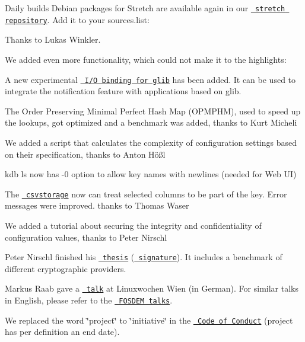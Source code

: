 Daily builds Debian packages for Stretch are available again in our \href{https://debian-stretch-repo.libelektra.org}{\texttt{ stretch repository}}. Add it to your {\ttfamily sources.\+list}\+:


\begin{DoxyCode}{0}
\end{DoxyCode}


Thanks to Lukas Winkler.

We added even more functionality, which could not make it to the highlights\+:


\begin{DoxyItemize}
\item A new experimental \href{https://www.libelektra.org/bindings/io_glib}{\texttt{ I/O binding for glib}} has been added. It can be used to integrate the notification feature with applications based on glib.
\item The Order Preserving Minimal Perfect Hash Map (O\+P\+M\+P\+HM), used to speed up the lookups, got optimized and a benchmark was added, thanks to Kurt Micheli
\item We added a script that calculates the complexity of configuration settings based on their specification, thanks to Anton Hößl
\item {\ttfamily kdb ls} now has {\ttfamily -\/0} option to allow key names with newlines (needed for Web UI)
\item The \href{https://www.libelektra.org/plugins/csvstorage}{\texttt{ csvstorage}} now can treat selected columns to be part of the key. Error messages were improved. thanks to Thomas Waser
\end{DoxyItemize}


\begin{DoxyItemize}
\item We added a tutorial about securing the integrity and confidentiality of configuration values, thanks to Peter Nirschl
\item Peter Nirschl finished his \href{https://www.libelektra.org/ftp/elektra/publications/nirschl2018cryptographic.pdf}{\texttt{ thesis}} (\href{https://www.libelektra.org/ftp/elektra/publications/nirschl2018cryptographic.pdf.sig}{\texttt{ signature}}). It includes a benchmark of different cryptographic providers.
\item Markus Raab gave a \href{https://cfp.linuxwochen.at/de/LWW18/public/events/798}{\texttt{ talk}} at Linuxwochen Wien (in German). For similar talks in English, please refer to the \href{https://fosdem.org/2018/schedule/speaker/markus_raab/}{\texttt{ F\+O\+S\+D\+EM talks}}.
\item We replaced the word \char`\"{}project\char`\"{} to \char`\"{}initiative\char`\"{} in the \href{https://www.libelektra.org/devgettingstarted/code-of-conduct}{\texttt{ Code of Conduct}} (project has per definition an end date).
\end{DoxyItemize}


